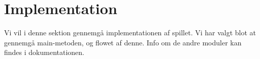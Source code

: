 \section{Implementation}
Vi vil i denne sektion gennemgå implementationen af spillet. Vi har valgt blot at gennemgå main-metoden, og flowet af denne. Info om de andre moduler kan findes i dokumentationen.